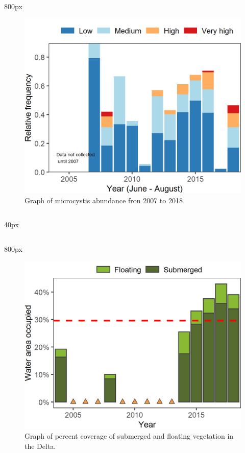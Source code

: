 \documentclass[
]{book}
\begin{document}
\begin{column}{800px\textwidth}
\begin{figure}
\includegraphics[width=15.25in]{figures/Microcystis_summer} \caption{Graph of microcystis abundance fron 2007 to 2018}\label{fig:unnamed-chunk-89}
\end{figure}
\end{column}

\begin{column}{40px\textwidth}
~
\end{column}

\begin{column}{800px\textwidth}
\begin{figure}
\includegraphics[width=15.25in]{figures/veg_perc} \caption{Graph of percent coverage of submerged and floating vegetation in the Delta.}\label{fig:unnamed-chunk-90}
\end{figure}
\end{column}
\end{document}
